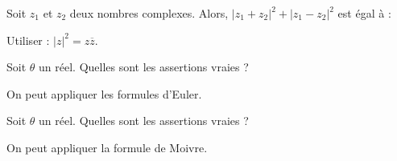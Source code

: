 \begin{question} 
Soit $z_1$ et $z_2$ deux nombres complexes. Alors, $|z_1+z_2|^2 + |z_1-z_2|^2$ est égal à : 
\begin{answers}
    


    

    

 
\end{answers}
\begin{explanations}
Utiliser :  $|z|^2= z\overline{z}$.
\end{explanations}

\end{question}

\begin{question} 
Soit $\theta$ un réel.  Quelles sont les assertions vraies ?
\begin{answers}

     
    
  

  
\end{answers}
\begin{explanations}
On peut appliquer les formules d'Euler.

\end{explanations}

\end{question}

\begin{question} 
Soit $\theta$ un réel.  Quelles sont les assertions vraies ?
\begin{answers}
    \good{$\cos(5\theta)= \cos^5\theta -10\cos^3\theta \sin^2\theta + 5\cos \theta\sin^4 \theta$}
    
    \bad{$\cos(5\theta)= \cos^5\theta +10\cos^3\theta \sin^2\theta + 5\cos \theta\sin^4 \theta$}

    \bad{$\sin(5\theta)= 5\cos^4\theta \sin\theta+10\cos^2\theta \sin^3\theta + \sin^5\theta$}

    \good{$\sin(5\theta)= 5\cos^4\theta \sin\theta-10\cos^2\theta \sin^3\theta + \sin^5\theta$}
\end{answers}
\begin{explanations}
On peut appliquer la formule de Moivre.

\end{explanations}

\end{question}


